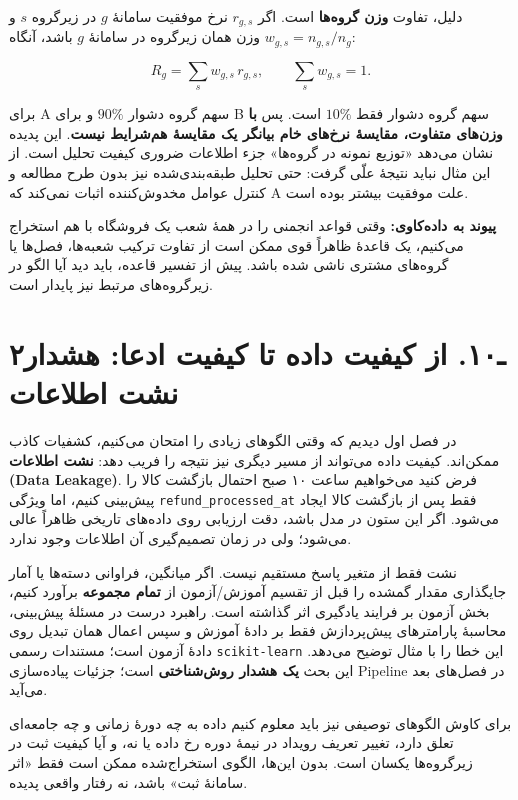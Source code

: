 \documentclass[12pt,a4paper,oneside]{book}
\begin{document}
دلیل، تفاوت \textbf{وزن گروه‌ها} است. اگر \(r_{g,s}\) نرخ موفقیت سامانهٔ \(g\) در زیرگروه \(s\) و \(w_{g,s}=n_{g,s}/n_g\) وزن همان زیرگروه در سامانهٔ \(g\) باشد، آنگاه:

\[
R_g=\sum_s w_{g,s}\,r_{g,s},\qquad \sum_s w_{g,s}=1.
\]

برای A سهم گروه دشوار \(90\%\) و برای B سهم گروه دشوار فقط \(10\%\) است. پس \textbf{با وزن‌های متفاوت، مقایسهٔ نرخ‌های خام بیانگر یک مقایسهٔ هم‌شرایط نیست}. این پدیده نشان می‌دهد «توزیع نمونه در گروه‌ها» جزء اطلاعات ضروری کیفیت تحلیل است. از این مثال نباید نتیجهٔ علّی گرفت: حتی تحلیل طبقه‌بندی‌شده نیز بدون طرح مطالعه و کنترل عوامل مخدوش‌کننده اثبات نمی‌کند که A علت موفقیت بیشتر بوده است.

\textbf{پیوند به داده‌کاوی:} وقتی قواعد انجمنی را در همهٔ شعب یک فروشگاه با هم استخراج می‌کنیم، یک قاعدهٔ ظاهراً قوی ممکن است از تفاوت ترکیب شعبه‌ها، فصل‌ها یا گروه‌های مشتری ناشی شده باشد. پیش از تفسیر قاعده، باید دید آیا الگو در زیرگروه‌های مرتبط نیز پایدار است.

\section{۲ـ۱۰. از کیفیت داده تا کیفیت ادعا: هشدار نشت اطلاعات}\label{ux640ux6f1ux6f0.-ux627ux632-ux6a9ux6ccux641ux6ccux62a-ux62fux627ux62fux647-ux62aux627-ux6a9ux6ccux641ux6ccux62a-ux627ux62fux639ux627-ux647ux634ux62fux627ux631-ux646ux634ux62a-ux627ux637ux644ux627ux639ux627ux62a}

در فصل اول دیدیم که وقتی الگوهای زیادی را امتحان می‌کنیم، کشفیات کاذب ممکن‌اند. کیفیت داده می‌تواند از مسیر دیگری نیز نتیجه را فریب دهد: \textbf{نشت اطلاعات (Data Leakage)}. فرض کنید می‌خواهیم ساعت ۱۰ صبح احتمال بازگشت کالا را پیش‌بینی کنیم، اما ویژگی \texttt{refund\_processed\_at} فقط پس از بازگشت کالا ایجاد می‌شود. اگر این ستون در مدل باشد، دقت ارزیابی روی داده‌های تاریخی ظاهراً عالی می‌شود؛ ولی در زمان تصمیم‌گیری آن اطلاعات وجود ندارد.

نشت فقط از متغیر پاسخ مستقیم نیست. اگر میانگین، فراوانی دسته‌ها یا آمار جایگذاری مقدار گمشده را قبل از تقسیم آموزش/آزمون از \textbf{تمام مجموعه} برآورد کنیم، بخش آزمون بر فرایند یادگیری اثر گذاشته است. راهبرد درست در مسئلهٔ پیش‌بینی، محاسبهٔ پارامترهای پیش‌پردازش فقط بر دادهٔ آموزش و سپس اعمال همان تبدیل روی دادهٔ آزمون است؛ مستندات رسمی \texttt{scikit-learn} این خطا را با مثال توضیح می‌دهد. این بحث \textbf{یک هشدار روش‌شناختی} است؛ جزئیات پیاده‌سازی Pipeline در فصل‌های بعد می‌آید.

برای کاوش الگوهای توصیفی نیز باید معلوم کنیم داده به چه دورهٔ زمانی و چه جامعه‌ای تعلق دارد، تغییر تعریف رویداد در نیمهٔ دوره رخ داده یا نه، و آیا کیفیت ثبت در زیرگروه‌ها یکسان است. بدون این‌ها، الگوی استخراج‌شده ممکن است فقط «اثر سامانهٔ ثبت» باشد، نه رفتار واقعی پدیده.
\end{document}
